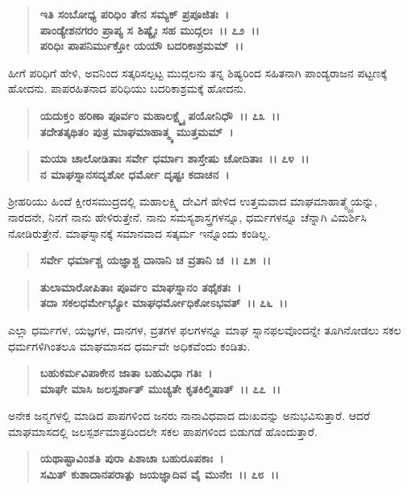 \begin{verse}
\textbf{ಇತಿ ಸಂಬೋಧ್ಯ ಪರಿಧಿಂ ತೇನ ಸಮ್ಯಕ್ ಪ್ರಪೂಜಿತಃ~।}\\\textbf{ಪಾಂಡ್ಯೇಶನಗರಂ ಪ್ರಾಪ್ಯ ಸ ಶಿಷ್ಯೈಃ ಸಹ ಮುದ್ಗಲಃ~।। ೭೨~।।}\\\textbf{ಪರಿಧಿಃ ಪಾಪನಿರ್ಮುಕ್ತೋ ಯಯೌ ಬದರಿಕಾಶ್ರಮಮ್~।।}
\end{verse}

ಹೀಗೆ ಪರಿಧಿಗೆ ಹೇಳಿ, ಅವನಿಂದ ಸತ್ಕರಿಸಲ್ಪಟ್ಟ ಮುದ್ಗಲನು ತನ್ನ ಶಿಷ್ಯರಿಂದ ಸಹಿತನಾಗಿ ಪಾಂಡ್ಯರಾಜನ ಪಟ್ಟಣಕ್ಕೆ ಹೋದನು. ಪಾಪರಹಿತನಾದ ಪರಿಧಿಯು ಬದರಿಕಾಶ್ರಮಕ್ಕೆ ಹೋದನು.

\begin{verse}
\textbf{ಯದುಕ್ತಂ ಹರಿಣಾ ಪೂರ್ವಂ ಮಹಾಲಕ್ಷ್ಮೈ ಪಯೋನಿಧೌ~।। ೭೩~।।}\\\textbf{ತದೇತತ್ಕಥಿತಂ ಪುತ್ರ ಮಾಘಮಾಹಾತ್ಮ್ಯ ಮುತ್ತಮಮ್~। }
\end{verse}

\begin{verse}
\textbf{ಮಯಾ ಚಾಲೋಡಿತಾಃ ಸರ್ವೇ ಧರ್ಮಾಃ ಶಾಸ್ತೇಷು ಚೋದಿತಾಃ~।। ೭೪~।।}\\\textbf{ನ ಮಾಘಸ್ನಾನಸದೃಶೋ ಧರ್ಮೋ ದೃಷ್ಟಃ ಕದಾಚನ~।}
\end{verse}

ಶ‍್ರೀಹರಿಯು ಹಿಂದೆ ಕ್ಷೀರಸಮುದ್ರದಲ್ಲಿ ಮಹಾಲಕ್ಷ್ಮಿ ದೇವಿಗೆ ಹೇಳಿದ ಉತ್ತಮವಾದ ಮಾಘಮಾಹಾತ್ಮ್ಯೈಯನ್ನು, ನಾರದನೇ, ನಿನಗೆ ನಾನು ಹೇಳಿರುತ್ತೇನೆ. ನಾನು ಸಮಸ್ಯಶಾಸ್ತ್ರಗಳನ್ನೂ, ಧರ್ಮಗಳನ್ನೂ ಚೆನ್ನಾಗಿ ವಿಮರ್ಶಿಸಿ ನೋಡಿರುತ್ತೇನೆ. ಮಾಘಸ್ನಾನಕ್ಕೆ ಸಮಾನವಾದ ಸತ್ಕರ್ಮ ಇನ್ನೊಂದು ಕಂಡಿಲ್ಲ.

\begin{verse}
\textbf{ಸರ್ವೇ ಧರ್ಮಾಶ್ಚ ಯಜ್ಞಾಶ್ಚ ದಾನಾನಿ ಚ ವ್ರತಾನಿ ಚ~।। ೭೫~।।} 
\end{verse}

\begin{verse}
\textbf{ತುಲಾಮಾರೋಪಿತಾಃ ಪೂರ್ವಂ ಮಾಘಸ್ನಾನಂ ತಥೈಕತಃ~।}\\\textbf{ತದಾ ಸಕಲಧರ್ಮೇಭ್ಯೋ ಮಾಘಧರ್ಮೋಧಿಕೋಽಭವತ್~।। ೭೬~।।}
\end{verse}

ಎಲ್ಲಾ ಧರ್ಮಗಳ, ಯಜ್ಞಗಳ, ದಾನಗಳ, ವ್ರತಗಳ ಫಲಗಳನ್ನೂ ಮಾಘ ಸ್ನಾನಫಲವೊಂದನ್ನೇ ತೂಗಿನೋಡಲು ಸಕಲ ಧರ್ಮಗಳಿಗಿಂತಲೂ ಮಾಘಮಾಸದ ಧರ್ಮವೇ ಅಧಿಕವೆಂದು ಕಂಡಿತು.

\begin{verse}
\textbf{ಬಹುಕರ್ಮವಿಪಾಕೇನ ಜಾತಾ ಬಹುವಿಧಾ ಗತಿಃ~।}\\\textbf{ಮಾಘೇ ಮಾಸಿ ಜಲಸ್ಪರ್ಶಾತ್ ಮುಚ್ಯತೇ ಕೃತಕಿಲ್ಮಿಷಾತ್~।। ೭೭~।।}
\end{verse}

ಅನೇಕ ಜನ್ಮಗಳಲ್ಲಿ ಮಾಡಿದ ಪಾಪಗಳಿಂದ ಜನರು ನಾನಾವಿಧವಾದ ದುಃಖವನ್ನು ಅನುಭವಿಸುತ್ತಾರೆ. ಆದರೆ ಮಾಘಮಾಸದಲ್ಲಿ ಜಲಸ್ಪರ್ಶಮಾತ್ರದಿಂದಲೇ ಸಕಲ ಪಾಪಗಳಿಂದ ಬಿಡುಗಡೆ ಹೊಂದುತ್ತಾರೆ.

\begin{verse}
\textbf{ಯಥಾಷ್ಟಾವಿಂಶತಿ ಪುರಾ ಪಿಶಾಚಾ ಬಹುರೂಪಕಾಃ~।}\\\textbf{ಸಮಿತ್ ಕುಶಾದಾನಪರಾತ್ಪು ಜಯಜ್ಞಾದಿವ ವೈ ಮುನೇಃ~।। ೭೮~।।}
\end{verse}

